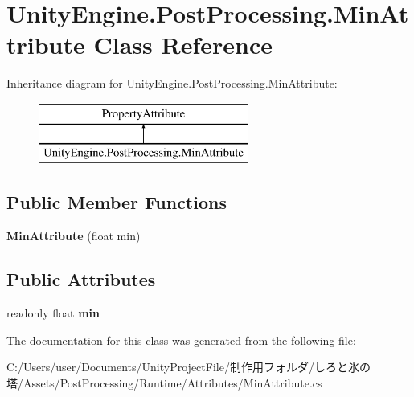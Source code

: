 \hypertarget{class_unity_engine_1_1_post_processing_1_1_min_attribute}{}\section{Unity\+Engine.\+Post\+Processing.\+Min\+Attribute Class Reference}
\label{class_unity_engine_1_1_post_processing_1_1_min_attribute}
Inheritance diagram for Unity\+Engine.\+Post\+Processing.\+Min\+Attribute\+:\begin{figure}[H]
\begin{center}
\leavevmode
\includegraphics[height=2.000000cm]{class_unity_engine_1_1_post_processing_1_1_min_attribute}
\end{center}
\end{figure}
\subsection*{Public Member Functions}
\begin{DoxyCompactItemize}
\item 
\mbox{\label{class_unity_engine_1_1_post_processing_1_1_min_attribute_ad7f32ba10ec48ba5d4b9eb31e43d1f5a}} 
{\bfseries Min\+Attribute} (float min)
\end{DoxyCompactItemize}
\subsection*{Public Attributes}
\begin{DoxyCompactItemize}
\item 
\mbox{\label{class_unity_engine_1_1_post_processing_1_1_min_attribute_abb5d80c69026f677751e55a30bfc2e84}} 
readonly float {\bfseries min}
\end{DoxyCompactItemize}


The documentation for this class was generated from the following file\+:\begin{DoxyCompactItemize}
\item 
C\+:/\+Users/user/\+Documents/\+Unity\+Project\+File/制作用フォルダ/しろと氷の塔/\+Assets/\+Post\+Processing/\+Runtime/\+Attributes/Min\+Attribute.\+cs\end{DoxyCompactItemize}
